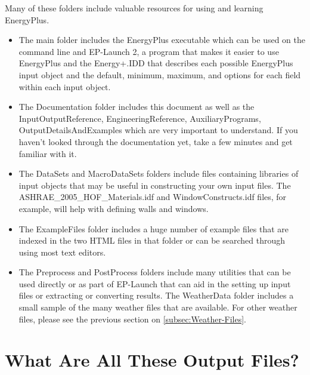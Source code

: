 Many of these folders include valuable resources for using and learning
EnergyPlus.
\begin{itemize}
\item The main folder includes the EnergyPlus executable which can be used
on the command line and EP-Launch 2, a program that makes it easier
to use EnergyPlus and the Energy+.IDD that describes each possible
EnergyPlus input object and the default, minimum, maximum, and options
for each field within each input object.
\item The Documentation folder includes this document as well as the InputOutputReference,
EngineeringReference, AuxiliaryPrograms, OutputDetailsAndExamples
which are very important to understand. If you haven't looked through
the documentation yet, take a few minutes and get familiar with it.
\item The DataSets and MacroDataSets folders include files containing libraries
of input objects that may be useful in constructing your own input
files. The ASHRAE\_2005\_HOF\_Materials.idf and WindowConstructs.idf
files, for example, will help with defining walls and windows.
\item The ExampleFiles folder includes a huge number of example files that
are indexed in the two HTML files in that folder or can be searched
through using most text editors.
\item The Preprocess and PostProcess folders include many utilities that
can be used directly or as part of EP-Launch that can aid in the setting
up input files or extracting or converting results. The WeatherData
folder includes a small sample of the many weather files that are
available. For other weather files, please see the previous section
on \ref{subsec:Weather-Files}.
\end{itemize}

\section{What Are All These Output Files?}

